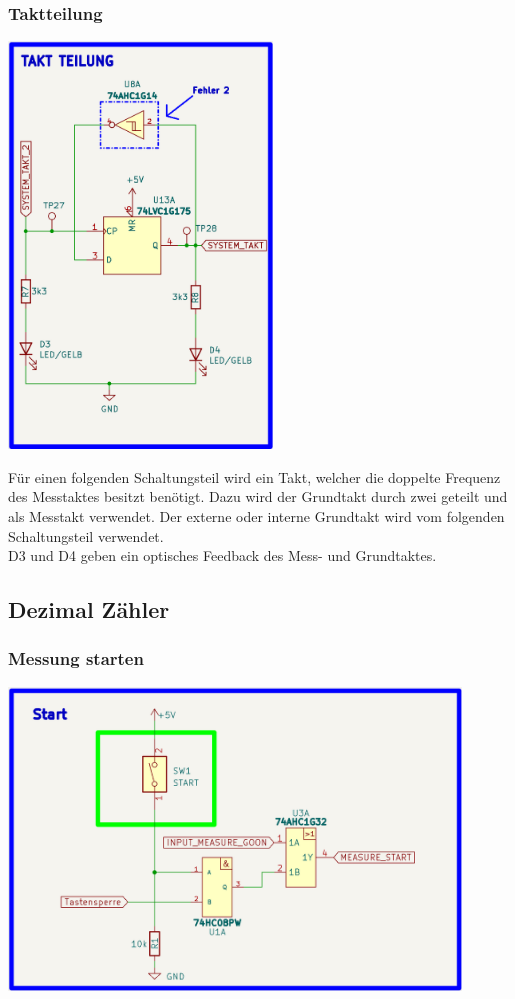 \newpage

\subsubsection{Taktteilung}

\begin{center}
\includegraphics[width=7cm]{Bilder/Taktteilung.png}
\end{center}

Für einen folgenden Schaltungsteil wird ein Takt, welcher die doppelte Frequenz des Messtaktes besitzt benötigt. Dazu wird der Grundtakt durch zwei geteilt und als Messtakt verwendet. Der externe oder interne Grundtakt wird vom folgenden Schaltungsteil verwendet.
\\
D3 und D4 geben ein optisches Feedback des Mess- und Grundtaktes. 


\subsection{Dezimal Zähler}

\subsubsection{Messung starten}

\begin{center}
\includegraphics[width=12cm]{Bilder/Start.png}
\end{center}

